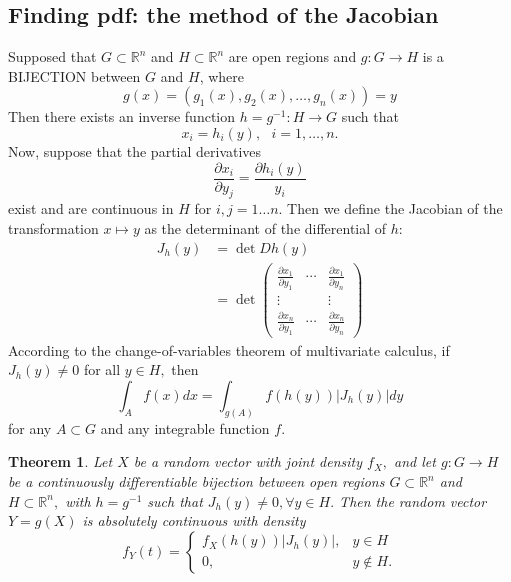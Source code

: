 \documentclass[12pt]{report} \addtolength{\textheight}{2in}
\newtheorem{thm}{Theorem}
\newcommand{\Realnum}{\mathbb{R}}
\begin{document}
\subsection*{Finding pdf: the method of the Jacobian}
Supposed that $G \subset \Realnum^n$ and $H \subset \Realnum^n$ are open regions and $g:G \to H$ is a BIJECTION between $G$ and $H$, where
\begin{displaymath}
g(x) = (g_1(x),g_2(x),\dots,g_n(x))=y
\end{displaymath}
Then there exists an inverse function $h=g^{-1}:H \to G$ such that 
\begin{displaymath}
x_i=h_i(y), \hspace{8pt} i=1,\dots, n.
\end{displaymath}
Now, suppose that the partial derivatives
\begin{displaymath}
\frac{\partial x_i}{\partial y_j}=\frac{\partial h_i(y)}{y_i}
\end{displaymath}
exist and are continuous in $H$ for $i,j=1 \dots n.$ Then we define the Jacobian of the transformation $x \mapsto y $ as the determinant of the differential of $h$:
\begin{align*}
J_h(y)&=\det D h(y)\\
&=\det \begin{pmatrix}
\frac{\partial x_1}{\partial y_1} & \cdots & \frac{\partial x_1}{\partial y_n}\\
\vdots& &\vdots\\
\frac{\partial x_n}{\partial y_1} & \cdots & \frac{\partial x_n}{\partial y_n}
\end{pmatrix}
\end{align*}
According to the change-of-variables theorem of multivariate calculus, if $J_h(y) \not = 0$ for all $y \in H,$ then
\begin{displaymath}
\int_A f(x) dx =\int_{g(A)} f(h(y)) |J_h(y)| dy
\end{displaymath}
for any $A \subset G$ and any integrable function $f.$
\begin{thm}
Let $X$ be a random vector with joint density $f_X,$ and let $g: G \to H$ be a continuously differentiable bijection between open regions $G \subset \Realnum^n$ and $H \subset \Realnum^n,$ with $h= g^{-1}$ such that $J_h(y)\not= 0, \forall y\in H.$ Then the random vector $Y = g(X)$ is absolutely continuous with density 
\begin{displaymath}
\boxed
{
f_Y(t) = \begin{cases}
f_X(h(y)) |J_h(y)|, & y\in H\\
0, & y \not\in H.

\end{cases}
}
\end{displaymath}
\end{thm}
\end{document}
